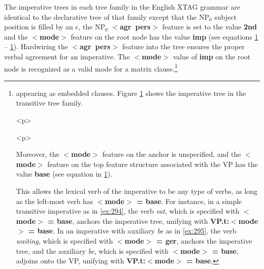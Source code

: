 The imperative trees in each tree family in the English XTAG grammar are 
identical to the declarative tree of that family except that the NP$_{0}$ 
subject position is filled by an $\epsilon$, the NP$_{0}$ {\bf $<$agr~pers$>$} feature is set to the value {\bf 2nd} and the {\bf $<$mode$>$} feature on the root node has the value {\bf imp} (see equations 
\ref{ex:291} -- \ref{ex:292}). Hardwiring the {\bf $<$agr~pers$>$} feature into the 
tree ensures the proper verbal agreement for an imperative.  The {\bf $<$mode$>$} value of {\bf imp} on the root node is recognized as a valid 
mode for a matrix clause.\footnote{%
appearing as embedded clauses.  Figure \ref{alphaInx0Vnx1} shows the 
imperative tree in the transitive tree family. 
 
\beginsentences
{}\label{ex:291} 
\label{ex:292} 
\endsentences

 
 
\begin{rawhtml} <p> \end{rawhtml}
\begin{rawhtml} <dl> <dt>{Transitive imperative tree: $\alpha$Inx0Vnx1 <p> </dl> \end{rawhtml}
\label{alphaInx0Vnx1} 
\label{2;11,1} 
\begin{rawhtml} <p> \end{rawhtml}
 
 
Moreover, the {\bf $<$mode$>$} feature on the anchor is unspecified, and 
the {\bf $<$mode$>$} feature on the top feature structure associated with 
the VP has the value {\bf base} (see equation in \ref{ex:293}). 
 
\beginsentences
{}\label{ex:293} 
\endsentences

 
This allows the lexical verb of the imperative to be any type of verbs, as 
long as the left-most verb has {\bf $<$mode$>$ = base}.  For instance, in a 
simple transitive imperative as in \ref{ex:294}, the verb {\it eat}, which is 
specified with {\bf $<$mode$>$ = base}, anchors the imperative tree, 
unifying with {\bf VP.t:$<$mode$>$ = base}.  In an imperative with 
auxiliary {\it be} as in \ref{ex:295}, the verb {\it waiting}, which is specified 
with {\bf $<$mode$>$ = ger}, anchors the imperative tree, and the auxiliary 
{\it be}, which is specified with {\bf $<$mode$>$ = base}, adjoins onto the 
VP, unifying with {\bf VP.t:$<$mode$>$ = base}. 
 
}
